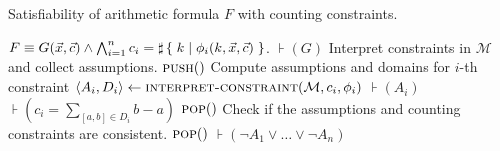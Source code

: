 \begin{algorithm}[h]
\caption{Satisfiability of arithmetic formula $F$ with counting constraints.}\label{arith}
\begin{algorithmic}[1]
\Require $F \equiv G(\vec{x}, \vec{c}) \land \bigwedge_{i=1}^n c_i = \sharp\left\lbrace\;k\;|\;\phi_i(k, \vec{x}, \vec{c})\;\right\rbrace$.
\State $\assert(G)$
    \LineComment Interpret constraints in $\mathcal{M}$ and collect assumptions.
    \State $\textsc{push}()$
        \LineComment Compute assumptions and domains for $i$-th constraint
        \State $\langle A_i, D_i \rangle \gets \textsc{interpret-constraint}(\mathcal{M}, c_i, \phi_i)$
        \State $\assert(A_i)$
        \State $\assert(c_i = \sum_{[a, b] \in D_i} b - a)$
			\State $\textsc{pop}()$
            \State {}
            \State {}
        \EndIf
    \EndFor
    \LineComment Check if the assumptions and counting constraints are consistent.
        \State {}
    \EndIf
    \State $\textsc{pop}()$
    \State $\assert(\lnot A_1 \vee \ldots \vee \lnot A_n)$
\EndWhile
\State \Return{\unsat}
\EndProcedure
\end{algorithmic}
\label{arith}
\end{algorithm}

